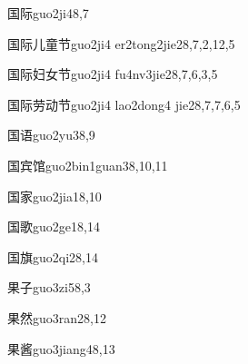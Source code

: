 \begin{verbete}{国际}{guo2ji4}{8,7}
\end{verbete}

\begin{verbete}{国际儿童节}{guo2ji4 er2tong2jie2}{8,7,2,12,5}
\end{verbete}

\begin{verbete}{国际妇女节}{guo2ji4 fu4nv3jie2}{8,7,6,3,5}
\end{verbete}

\begin{verbete}{国际劳动节}{guo2ji4 lao2dong4 jie2}{8,7,7,6,5}
\end{verbete}

\begin{verbete}{国语}{guo2yu3}{8,9}
\end{verbete}

\begin{verbete}{国宾馆}{guo2bin1guan3}{8,10,11}
\end{verbete}

\begin{verbete}{国家}{guo2jia1}{8,10}
\end{verbete}

\begin{verbete}{国歌}{guo2ge1}{8,14}
\end{verbete}

\begin{verbete}{国旗}{guo2qi2}{8,14}
\end{verbete}

\begin{verbete}{果子}{guo3zi5}{8,3}
\end{verbete}

\begin{verbete}{果然}{guo3ran2}{8,12}
\end{verbete}

\begin{verbete}{果酱}{guo3jiang4}{8,13}
\end{verbete}


